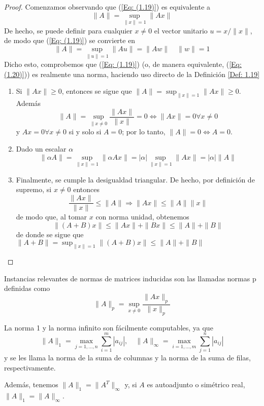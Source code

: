 \begin{proof}
    Comenzamos observando que (\ref{Eq: (1.19)}) es equivalente a
    \begin{equation}
        \|A\| = \sup_{\|x\| = 1}{\|Ax\|}
        \label{Eq: (1.20)}
    \end{equation}
    De hecho, se puede definir para cualquier $x \neq 0$ el vector unitario $u = x / \|x\|$, de modo que (\ref{Eq: (1.19)}) se convierte en
    \[ \|A\| = \sup_{\|u\| = 1}{\|Au\|} = \|Aw\| \quad \|w\| = 1 \]
    Dicho esto, comprobemos que (\ref{Eq: (1.19)}) (o, de manera equivalente, (\ref{Eq: (1.20)})) es realmente una norma, haciendo uso directo de la Definición \ref{Def: 1.19}
    \begin{enumerate}
        \item Si $\|Ax\| \geq 0$, entonces se sigue que $\|A\| =  \sup_{\|x\| = 1}{\|Ax\| \geq 0}$. Además
        \[ \|A\| = \sup_{\|x \neq 0}{\frac{\|Ax\|}{\|x\|}} = 0 \Leftrightarrow \|Ax\| = 0 \forall x \neq 0\]
        y $Ax = 0 \forall x \neq 0$ si y solo si $A = 0$; por lo tanto, $\|A\| = 0 \Leftrightarrow A = 0$.
        \item Dado un escalar $\alpha$
        \[ \|\alpha A\| = \sup_{\|x\|=1}{\|\alpha A x\|} = |\alpha| \sup_{\|x\| = 1} {\|Ax\|} = |\alpha| \|A\| \]
        \item Finalmente, se cumple la desigualdad triangular. De hecho, por definición de supremo, si $x \neq 0$ entonces
        \[ \frac{\|Ax\|}{\|x\|} \leq \|A\| \Rightarrow \|Ax\| \leq \|A\| \|x\| \]
        de modo que, al tomar $x$ con norma unidad, obtenemos
        \[ \|(A + B)x\| \leq \|Ax\| + \|Bx\| \leq  \|A\| + \|B\| \]
        de donde se sigue que $\|A+B\| = \sup_{\|x\|= 1}{\|(A+ B) x\|} \leq \|A\| + \|B\|$
    \end{enumerate}
\end{proof}

Instancias relevantes de normas de matrices inducidas son las llamadas normas p definidas como
\[\|A\|_p = \sup_{x \neq 0}{\frac{\|Ax\|_p}{\|x\|_p}}\]

La norma 1 y la norma infinito son fácilmente computables, ya que
\[ \|A\|_1 = \max_{j = 1,...,n}{\sum_{i = 1}^{m}{|a_{ij}|}}, \quad \|A\|_\infty = \max_{i=1,...,m}{\sum_{j = 1}^{n}{|a_{ij}|}} \]
y se les llama la norma de la suma de columnas y la norma de la suma de filas, respectivamente.

Además, tenemos $\|A\|_1 = \|A^T\|_\infty$ y, si $A$ es autoadjunto o simétrico real, $\|A\|_1 = \|A\|_\infty$.

